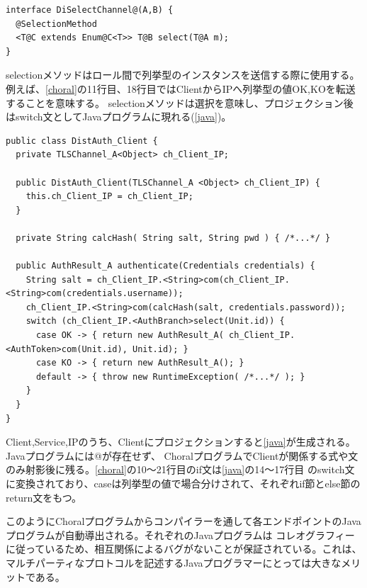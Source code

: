 \documentclass{thesis}
\begin{document}
\begin{lstlisting}[caption=selectionメソッドの定義,label=select]
interface DiSelectChannel@(A,B) {
  @SelectionMethod
  <T@C extends Enum@C<T>> T@B select(T@A m);
} 
\end{lstlisting}
selectionメソッドはロール間で列挙型のインスタンスを送信する際に使用する。
例えば、\ref{choral}の11行目、18行目ではClientからIPへ列挙型の値OK,KOを転送することを意味する。
selectionメソッドは選択を意味し、プロジェクション後はswitch文としてJavaプログラムに現れる(\ref{java})。
\begin{lstlisting}[caption=生成されたClientのJavaプログラム(分散認証),label=java]
public class DistAuth_Client {
  private TLSChannel_A<Object> ch_Client_IP;

  public DistAuth_Client(TLSChannel_A <Object> ch_Client_IP) {
    this.ch_Client_IP = ch_Client_IP;
  }

  private String calcHash( String salt, String pwd ) { /*...*/ }

  public AuthResult_A authenticate(Credentials credentials) {
    String salt = ch_Client_IP.<String>com(ch_Client_IP.<String>com(credentials.username));
    ch_Client_IP.<String>com(calcHash(salt, credentials.password));
    switch (ch_Client_IP.<AuthBranch>select(Unit.id)) {
      case OK -> { return new AuthResult_A( ch_Client_IP.<AuthToken>com(Unit.id), Unit.id); }
      case KO -> { return new AuthResult_A(); }
      default -> { throw new RuntimeException( /*...*/ ); }
    }
  }
}
\end{lstlisting}
Client,Service,IPのうち、Clientにプロジェクションすると\ref{java}が生成される。Javaプログラムには@が存在せず、
ChoralプログラムでClientが関係する式や文のみ射影後に残る。\ref{choral}の10〜21行目のif文は\ref{java}の14〜17行目
のswitch文に変換されており、caseは列挙型の値で場合分けされて、それぞれif節とelse節のreturn文をもつ。

このようにChoralプログラムからコンパイラーを通して各エンドポイントのJavaプログラムが自動導出される。それぞれのJavaプログラムは
コレオグラフィーに従っているため、相互関係によるバグがないことが保証されている。これは、マルチパーティなプロトコルを記述するJavaプログラマーにとっては大きなメリットである。

\end{document}
